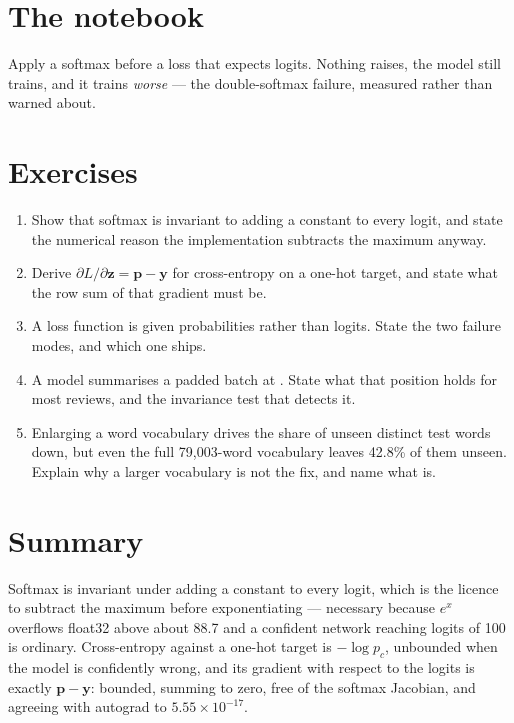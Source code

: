 \documentclass[11pt,a4paper]{article}
\begin{document}
\section{The notebook}

\begin{trybox}[title={What to change}]
Apply a softmax before a loss that expects logits. Nothing raises, the model
still trains, and it trains \emph{worse} --- the double-softmax failure,
measured rather than warned about.
\end{trybox}

\section{Exercises}

\begin{enumerate}[leftmargin=1.6em,itemsep=4pt]
  \item Show that softmax is invariant to adding a constant to every logit, and
        state the numerical reason the implementation subtracts the maximum
        anyway. \hfill \scope{[5]}
  \item Derive $\partial L/\partial\mathbf{z} = \mathbf{p} - \mathbf{y}$ for
        cross-entropy on a one-hot target, and state what the row sum of that
        gradient must be. \hfill \scope{[5]}
  \item A loss function is given probabilities rather than logits. State the
        two failure modes, and which one ships. \hfill \scope{[5]}
  \item A model summarises a padded batch at . State what
        that position holds for most reviews, and the invariance test that
        detects it. \hfill \scope{[5]}
  \item Enlarging a word vocabulary drives the share of unseen distinct test
        words down, but even the full 79{,}003-word vocabulary leaves 42.8\% of
        them unseen. Explain why a larger vocabulary is not the fix, and name
        what is. \hfill \scope{[4]}
\end{enumerate}

\section*{Summary}

Softmax is invariant under adding a constant to every logit, which is the
licence to subtract the maximum before exponentiating --- necessary because
$e^x$ overflows float32 above about 88.7 and a confident network reaching
logits of 100 is ordinary. Cross-entropy against a one-hot target is
$-\log p_c$, unbounded when the model is confidently wrong, and its gradient
with respect to the logits is exactly $\mathbf{p} - \mathbf{y}$: bounded,
summing to zero, free of the softmax Jacobian, and agreeing with autograd to
$5.55\times10^{-17}$.
\end{document}
